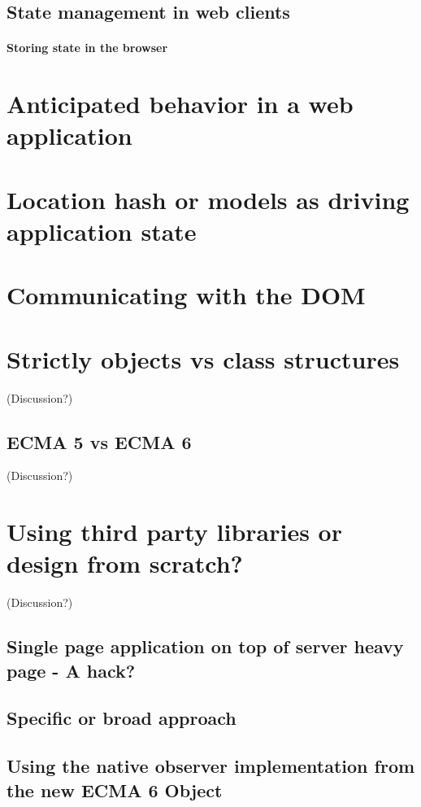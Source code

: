 \documentclass[english]{ifimaster}
\begin{document}
\subsection{State management in web clients}
\paragraph{Storing state in the browser}

\section{Anticipated behavior in a web application}
\section{Location hash or models as driving application state}

\section{Communicating with the DOM}

\section{Strictly objects vs class structures} (Discussion?)
\subsection{ECMA 5 vs ECMA 6} (Discussion?)

\section{Using third party libraries or design from scratch?} (Discussion?)

\subsection{Single page application on top of server heavy page - A hack?}
\subsection{Specific or broad approach}
\subsection{Using the native observer implementation from the new ECMA 6 Object}
\end{document}

